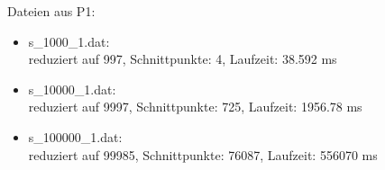\documentclass[12pt]{scrartcl}
\begin{document}
Dateien aus P1:\\
\begin{itemize}
    \item s\_1000\_1.dat:   \\reduziert auf 997, Schnittpunkte: 4, Laufzeit: 38.592 ms
    \item s\_10000\_1.dat:  \\reduziert auf 9997, Schnittpunkte: 725, Laufzeit: 1956.78 ms
    \item s\_100000\_1.dat: \\reduziert auf 99985, Schnittpunkte: 76087, Laufzeit: 556070 ms
\end{itemize}


\begin{lstlisting}[style=Terminal, caption={testing.cpp: Ausgabe Konsole},captionpos=b, label={lst:ausgabe_test}]
\end{lstlisting}
\end{document}
